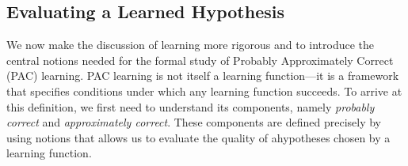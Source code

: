 \subsection{Evaluating a Learned Hypothesis}\label{subsec:evaluating-hypothesis}

We now make the discussion of learning more rigorous and to introduce the central notions needed for the formal study of Probably Approximately Correct (PAC) learning. PAC learning is not itself a learning function—it is a framework that specifies conditions under which any learning function succeeds. To arrive at this definition, we first need to understand its components, namely \textit{probably correct} and \textit{approximately correct}. These components are defined precisely by using notions that allows us to evaluate the quality of ahypotheses chosen by a learning function.



